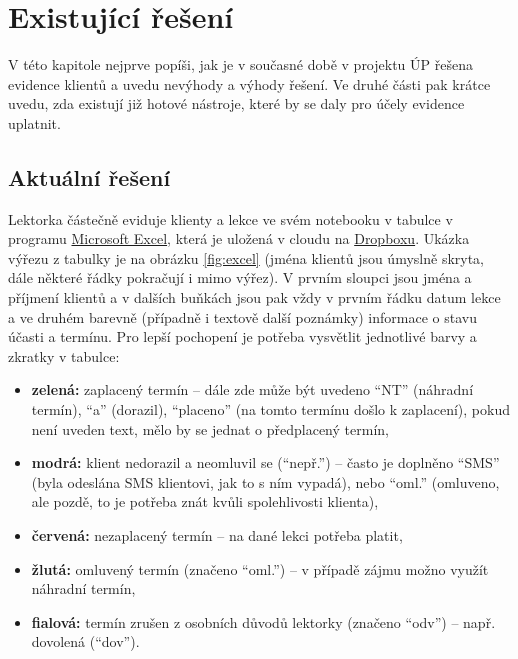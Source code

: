 \chapter{Existující řešení}
V této kapitole nejprve popíši, jak je v současné době v projektu ÚP řešena evidence klientů a uvedu nevýhody a výhody řešení. Ve druhé části pak krátce uvedu, zda existují již hotové nástroje, které by se daly pro účely evidence uplatnit.
    
    \section{Aktuální řešení}\label{aktualni-reseni}
    Lektorka částečně eviduje klienty a lekce ve svém notebooku v tabulce v programu \href{https://products.office.com/cs-cz/excel}{Microsoft Excel}, která je uložená v cloudu na \href{https://www.dropbox.com/}{Dropboxu}. Ukázka výřezu z tabulky je na obrázku \ref{fig:excel} (jména klientů jsou úmyslně skryta, dále některé řádky pokračují i mimo výřez). V prvním sloupci jsou jména a příjmení klientů a v dalších buňkách jsou pak vždy v prvním řádku datum lekce a ve druhém barevně (případně i textově další poznámky) informace o stavu účasti a termínu. Pro lepší pochopení je potřeba vysvětlit jednotlivé barvy a zkratky v tabulce:
    
    \begin{itemize}
      \item \textbf{zelená:} zaplacený termín -- dále zde může být uvedeno \enquote{NT} (náhradní termín), \enquote{a} (dorazil), \enquote{placeno} (na tomto termínu došlo k zaplacení), pokud není uveden text, mělo by se jednat o předplacený termín,
      \item \textbf{modrá:} klient nedorazil a neomluvil se (\enquote{nepř.}) -- často je doplněno \enquote{SMS} (byla odeslána SMS klientovi, jak to s ním vypadá), nebo \enquote{oml.} (omluveno, ale pozdě, to je potřeba znát kvůli spolehlivosti klienta),
      \item \textbf{červená:} nezaplacený termín -- na dané lekci potřeba platit,
      \item \textbf{žlutá:} omluvený termín (značeno \enquote{oml.}) -- v případě zájmu možno využít náhradní termín,
      \item \textbf{fialová:} termín zrušen z osobních důvodů lektorky (značeno \enquote{odv}) -- např. dovolená (\enquote{dov}).
    \end{itemize}
    
